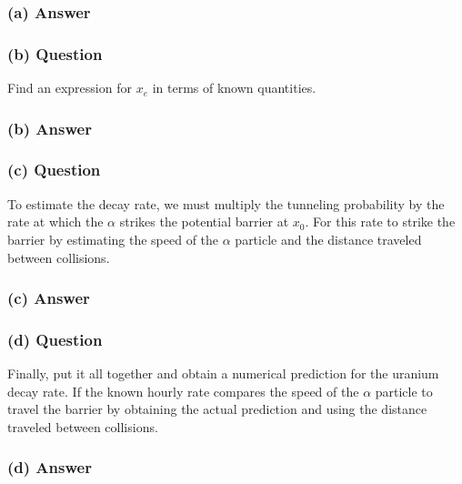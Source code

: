 \documentclass{article}
\begin{document}
\subsubsection*{(a) Answer}

\subsubsection*{(b) Question}
Find an expression for \( x_e \) in terms of known quantities.

\subsubsection*{(b) Answer}

\subsubsection*{(c) Question}
To estimate the decay rate, we must multiply the tunneling probability by the rate at which the \( \alpha \) strikes the potential barrier at \( x_0 \). For this rate to strike the barrier by estimating the speed of the \( \alpha \) particle and the distance traveled between collisions.

\subsubsection*{(c) Answer}

\subsubsection*{(d) Question}
Finally, put it all together and obtain a numerical prediction for the uranium decay rate. If the known hourly rate compares the speed of the \( \alpha \) particle to travel the barrier by obtaining the actual prediction and using the distance traveled between collisions.

\subsubsection*{(d) Answer}
\end{document}
